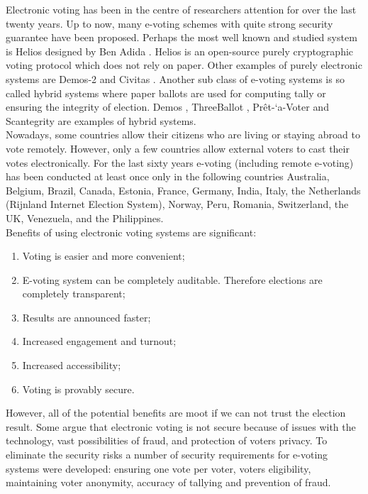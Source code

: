 \documentclass[12pt]{article}
\begin{document}
Electronic voting has been in the centre of researchers attention for over the last twenty years. Up to now, many e-voting schemes with quite strong security guarantee have been proposed. Perhaps the most well known and studied system is Helios designed by Ben Adida \cite{Adida2008}.  Helios is an open-source purely cryptographic voting protocol which does not rely on paper. Other examples of purely electronic systems are Demos-2 \cite{Kiayias2015} and Civitas \cite{Clarkson2008}.  Another sub class of e-voting systems is so called hybrid systems where paper ballots are used for computing tally or ensuring the integrity of election. Demos \cite{Kiayias2015a}, ThreeBallot \cite{Rivest2006}, Pr\^{e}t-`a-Voter \cite{Ryan2006} and Scantegrity \cite{Chaum2009} are examples of hybrid systems.  \\

Nowadays, some countries allow their citizens who are living or staying abroad to vote remotely. However, only a few countries allow external voters to cast their votes electronically. For the last sixty years e-voting (including remote e-voting) has been conducted at least once only in the following countries Australia, Belgium, Brazil, Canada, Estonia, France, Germany, India, Italy, the Netherlands (Rijnland Internet Election System), Norway, Peru, Romania, Switzerland, the UK, Venezuela, and the Philippines.\\

Benefits of using electronic voting systems are significant:
\begin{enumerate}
\item Voting is easier and more convenient;
\item E-voting system can be completely auditable. Therefore elections are completely transparent;
\item Results are announced faster;
\item Increased engagement and turnout; 
\item Increased accessibility;
\item Voting is provably secure.
 \end{enumerate}

However, all of the potential benefits are moot if we can not trust the election result. Some argue that electronic voting is not secure because of issues with the technology, vast possibilities of fraud, and protection of voters privacy.  To eliminate the security risks a number of security requirements for e-voting systems were developed: ensuring one vote per voter, voters eligibility, maintaining voter anonymity, accuracy of tallying and prevention of fraud.\\
 
\end{document}

